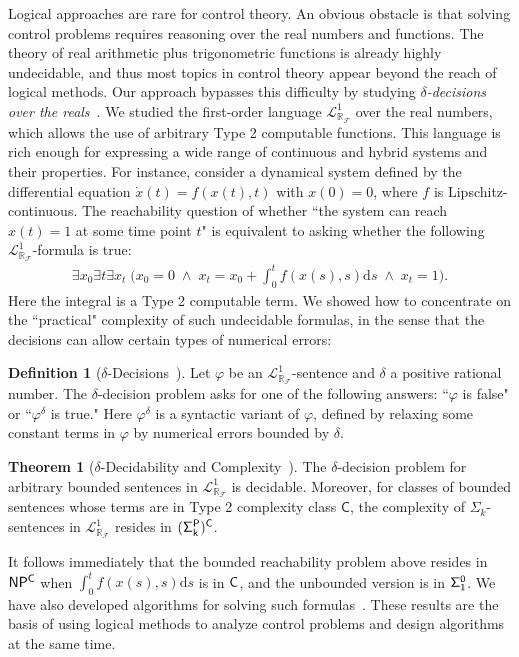 \documentclass[10pt]{article}
\newcommand{\lrf}{\mathcal{L}_{\mathbb{R}_{\mathcal{F}}}}
\theoremstyle{definition}
\newtheorem{definition}{Definition}
\newtheorem{theorem}{Theorem}
\begin{document}
Logical approaches are rare for control theory. An obvious obstacle is that solving control problems requires reasoning over the real numbers and functions. The theory of real arithmetic plus trigonometric functions is already highly undecidable, and thus most topics in control theory appear beyond the reach of logical methods. Our approach bypasses this difficulty by studying {\em $\delta$-decisions over the reals}~\cite{DBLP:conf/lics/GaoAC12}. We studied the first-order language $\lrf^1$ over the real numbers, which allows the use of arbitrary Type 2 computable functions. This language is rich enough for expressing a wide range of continuous and hybrid systems and their properties. For instance, consider a dynamical system defined by the differential equation $\dot{x}(t) = f(x(t),t)$ with $x(0)= 0$, where $f$ is Lipschitz-continuous. The reachability question of whether ``the system can reach $x(t)=1$ at some time point $t$" is equivalent to asking whether the following $\mathcal{L}^1_{\mathbb{R}_{\mathcal{F}}}$-formula is true:
\begin{eqnarray*}\exists x_0 \exists t \exists x_t\; \bigg(x_0 = 0 \;\wedge\; x_t = x_0 + \int_{0}^t f(x(s),s)\mathrm{d}s\; \wedge\; x_t = 1\bigg).\end{eqnarray*}
Here the integral is a Type 2 computable term. We showed how to concentrate on the ``practical" complexity of such undecidable formulas, in the sense that the decisions can allow certain types of numerical errors:
\begin{definition}[$\delta$-Decisions~\cite{DBLP:conf/lics/GaoAC12}] Let $\varphi$ be an $\lrf^1$-sentence and $\delta$ a positive rational number. The $\delta$-decision problem asks for one of the following answers: ``$\varphi$ is false" or ``$\varphi^{\delta}$ is true." Here $\varphi^{\delta}$ is a syntactic variant of $\varphi$, defined by relaxing some constant terms in $\varphi$ by numerical errors bounded by $\delta$. 
\end{definition}
\begin{theorem}[$\delta$-Decidability and Complexity~\cite{DBLP:conf/lics/GaoAC12}] The $\delta$-decision problem for arbitrary bounded sentences in $\lrf^1$ is decidable. Moreover, for classes of bounded sentences whose terms are in Type 2 complexity class $\mathsf{C}$, the complexity of $\Sigma_k$-sentences in $\lrf^1$ resides in ${\sf (\Sigma^P_k)^C}$. 
\end{theorem}
It follows immediately that the bounded reachability problem above resides in ${\sf NP^C}$ when $\int_{0}^t f(x(s),s)\mathrm{d}s$ is in ${\sf C}$, and the unbounded version is in ${\sf \Sigma^0_1}$. We have also developed algorithms for solving such formulas~\cite{DBLP:conf/fmcad/GaoKC13}. These results are the basis of using logical methods to analyze control problems and design algorithms at the same time. 
\end{document}

